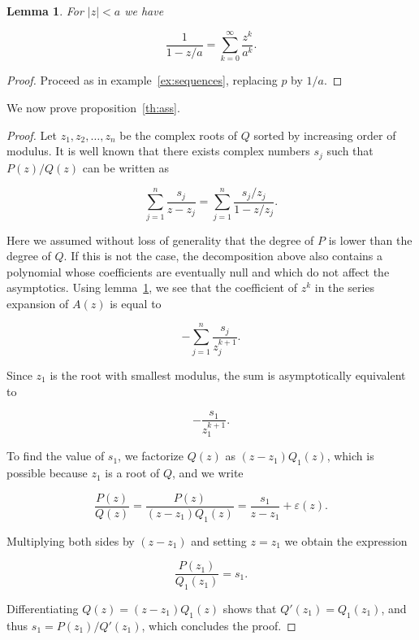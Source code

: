 \documentclass{article}
\newtheorem{lemma}{Lemma}
\begin{document}
\begin{lemma}
\label{lemma:poles}
For $|z| < a$ we have

\begin{equation}
\label{eq:poles}
\frac{1}{1-z/a} = \sum_{k=0}^\infty \frac{z^k}{a^k}.
\end{equation}
\end{lemma}

\begin{proof}
Proceed as in example~\ref{ex:sequences}, replacing $p$ by $1/a$.
\end{proof}

We now prove proposition~\ref{th:ass}.

\begin{proof}
Let $z_1, z_2, \ldots, z_n$ be the complex roots of $Q$ sorted by
increasing order of modulus. It is well known that there exists complex
numbers $s_j$ such that $P(z)/Q(z)$ can be written as

\begin{equation}
\sum_{j=1}^n \frac{s_j}{z-z_j} =
\sum_{j=1}^n \frac{s_j/z_j}{1-z/z_j}.
\end{equation}

Here we assumed without loss of generality that the degree of $P$ is lower
than the degree of $Q$. If this is not the case, the decomposition above
also contains a polynomial whose coefficients are eventually null and
which do not affect the asymptotics. Using lemma~\ref{lemma:poles}, we see
that the coefficient of $z^k$ in the series expansion of $A(z)$ is equal
to

\begin{equation}
\label{eq:fullass}
-\sum_{j=1}^n \frac{s_j}{z_j^{k+1}}.
\end{equation}

Since $z_1$ is the root with smallest modulus, the sum is asymptotically
equivalent to

\begin{equation*}
-\frac{s_1}{z_1^{k+1}}.
\end{equation*}

To find the value of $s_1$, we factorize $Q(z)$ as
$(z-z_1)Q_1(z)$, which is possible because $z_1$ is a root of $Q$,
and we write

\begin{equation*}
\frac{P(z)}{Q(z)} =
\frac{P(z)}{(z-z_1)Q_1(z)} = \frac{s_1}{z-z_1} +
\varepsilon(z).
\end{equation*}

Multiplying both sides by $(z-z_1)$ and setting $z = z_1$ we obtain
the expression

\begin{equation*}
\frac{P(z_1)}{Q_1(z_1)} = s_1.
\end{equation*}

Differentiating $Q(z) = (z-z_1)Q_1(z)$ shows that $Q'(z_1) =
Q_1(z_1)$, and thus $s_1 = P(z_1) / Q'(z_1)$, which concludes the proof.
\end{proof}
\end{document}
